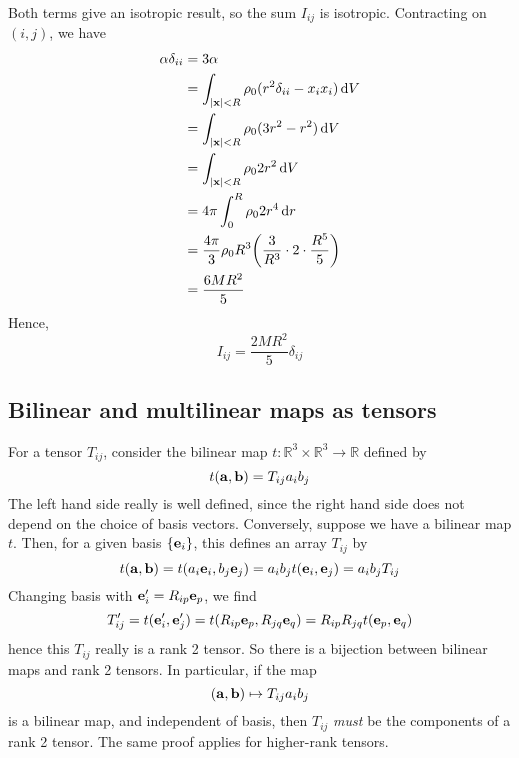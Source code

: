 Both terms give an isotropic result, so the sum \(I_{ij}\) is isotropic.
Contracting on \((i, j)\), we have
\begin{align*}
	\alpha \delta_{ii} & = 3\alpha                                                                  \\
	                   & = \int_{\abs{\vb x} < R} \rho_0 (r^2 \delta_{ii} - x_i x_i) \dd{V}         \\
	                   & = \int_{\abs{\vb x} < R} \rho_0 (3r^2 - r^2) \dd{V}                        \\
	                   & = \int_{\abs{\vb x} < R} \rho_0 2r^2 \dd{V}                                \\
	                   & = 4\pi \int_0^R \rho_0 2r^4 \dd{r}                                         \\
	                   & = \frac{4\pi}{3}\rho_0 R^3 \qty(\frac{3}{R^3} \cdot 2 \cdot \frac{R^5}{5}) \\
	                   & = \frac{6MR^2}{5}
\end{align*}
Hence,
\[
	I_{ij} = \frac{2MR^2}{5}\delta_{ij}
\]

\subsection{Bilinear and multilinear maps as tensors}
For a tensor \(T_{ij}\), consider the bilinear map \(t \colon \mathbb R^3 \times \mathbb R^3 \to \mathbb R\) defined by
\[
	t(\vb a, \vb b) = T_{ij} a_i b_j
\]
The left hand side really is well defined, since the right hand side does not depend on the choice of basis vectors.
Conversely, suppose we have a bilinear map \(t\).
Then, for a given basis \(\{\vb e_i\}\), this defines an array \(T_{ij}\) by
\[
	t(\vb a, \vb b) = t(a_i \vb e_i, b_j \vb e_j) = a_i b_j t(\vb e_i, \vb e_j) = a_i b_j T_{ij}
\]
Changing basis with \(\vb e_i' = R_{ip} \vb e_p\), we find
\[
	T_{ij}' = t(\vb e_i', \vb e_j') = t(R_{ip} \vb e_p, R_{jq} \vb e_q) = R_{ip} R_{jq} t(\vb e_p, \vb e_q)
\]
hence this \(T_{ij}\) really is a rank 2 tensor.
So there is a bijection between bilinear maps and rank 2 tensors.
In particular, if the map
\[
	(\vb a, \vb b) \mapsto T_{ij} a_i b_j
\]
is a bilinear map, and independent of basis, then \(T_{ij}\) \textit{must} be the components of a rank 2 tensor.
The same proof applies for higher-rank tensors.

